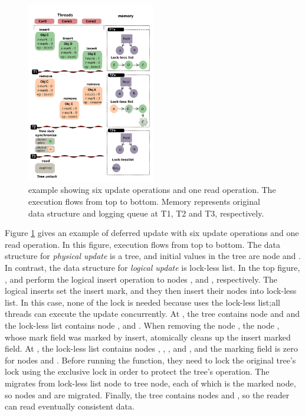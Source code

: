 \begin{figure}[tb]
  \begin{center}
     \includegraphics[width=0.5\textwidth,height=0.5\textheight,keepaspectratio]{fig/basic}
  \end{center}
  \caption{ example showing six update operations and one read
  operation. The execution flows from top to bottom. Memory represents original
  data structure and logging queue at T1, T2 and T3, respectively.}
  \label{fig:basic}
\end{figure}


Figure \ref{fig:basic} gives an example of deferred update with six update
operations and one read operation.
In this figure, execution flows from top to bottom.
The data structure for \emph{physical update} is a tree, and initial values in
the tree are node  and .
In contrast, the data structure for \emph{logical update} is lock-less list.
In the top figure, ,  and  perform the
logical insert operation to nodes ,  and ,
 respectively.
The logical inserts set the insert mark, and they then insert their
nodes into lock-less list.
In this case, none of the lock is needed because  uses the lock-less
list;all threads can execute the update concurrently.
At , the tree contains node 
and  and 
the lock-less list contains node ,  and .
When removing the node , the node , whose mark field was marked
by insert, atomically cleans up the insert marked field.
At , the lock-less list contains nodes
, , , and , and the marking field is zero for 
nodes  and .
Before running the  function, they need to lock the original
 tree's lock using the exclusive lock in order to protect the tree's
 operation.
The  migrates from lock-less list node to tree node, each of 
which is the marked node, so nodes  and  are migrated.
Finally, the tree contains nodes  and , so the reader can read
 eventually consistent data.



